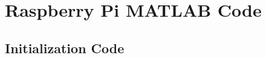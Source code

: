 \chapter{Raspberry Pi MATLAB Code}

\section{}


\section{Initialization Code}
\label{ch:RPI3_SPI_Int}



